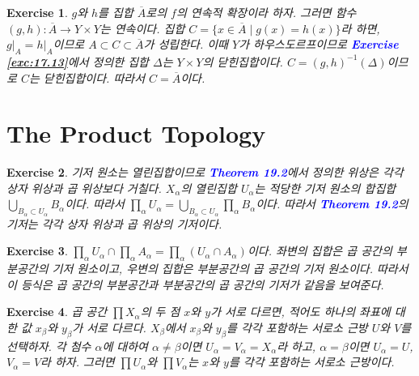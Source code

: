\documentclass{article}
\newtheorem{exercise}{Exercise}[section]
\begin{document}
\begin{exercise}
    $g$와 $h$를 집합 $\overline{A}$로의 $f$의 연속적 확장이라 하자. 그러면 함수 $(g,h):\overline{A}\to Y\times Y$는 연속이다. 집합 $C=\{x\in \overline{A}\mid g(x)=h(x)\}$라 하면, $g\vert_A=h\vert_A$이므로 $A\subset C\subset\overline{A}$가 성립한다. 이때 $Y$가 하우스도르프이므로 \textcolor{blue}{\textbf{Exercise \ref{exc:17.13}}}에서 정의한 집합 $\Delta$는 $Y\times Y$의 닫힌집합이다. $C=(g,h)^{-1}(\Delta)$이므로 $C$는 닫힌집합이다. 따라서 $C=\overline{A}$이다.
\end{exercise}

\section{The Product Topology}

\begin{exercise}
    기저 원소는 열린집합이므로 \textcolor{blue}{\textbf{Theorem 19.2}}에서 정의한 위상은 각각 상자 위상과 곱 위상보다 거칠다. $X_\alpha$의 열린집합 $U_\alpha$는 적당한 기저 원소의 합집합 $\bigcup_{B_\alpha\subset U_\alpha}B_\alpha$이다. 따라서 $\prod_{\alpha}U_\alpha=\bigcup_{B_\alpha\subset U_\alpha}\prod_\alpha B_\alpha$이다. 따라서 \textcolor{blue}{\textbf{Theorem 19.2}}의 기저는 각각 상자 위상과 곱 위상의 기저이다.
\end{exercise}

\begin{exercise}
    $\prod_\alpha U_\alpha\cap\prod_\alpha A_\alpha=\prod_\alpha(U_\alpha\cap A_\alpha)$이다. 좌변의 집합은 곱 공간의 부분공간의 기저 원소이고, 우변의 집합은 부분공간의 곱 공간의 기저 원소이다. 따라서 이 등식은 곱 공간의 부분공간과 부분공간의 곱 공간의 기저가 같음을 보여준다.
\end{exercise}

\begin{exercise}
    곱 공간 $\prod X_\alpha$의 두 점 $x$와 $y$가 서로 다르면, 적어도 하나의 좌표에 대한 값 $x_\beta$와 $y_\beta$가 서로 다르다. $X_\beta$에서 $x_\beta$와 $y_\beta$를 각각 포함하는 서로소 근방 $U$와 $V$를 선택하자. 각 첨수 $\alpha$에 대하여 $\alpha\ne\beta$이면 $U_\alpha=V_\alpha=X_\alpha$라 하고, $\alpha=\beta$이면 $U_\alpha=U$, $V_\alpha=V$라 하자. 그러면 $\prod U_\alpha$와 $\prod V_\alpha$는 $x$와 $y$를 각각 포함하는 서로소 근방이다.
\end{exercise}
\end{document}
